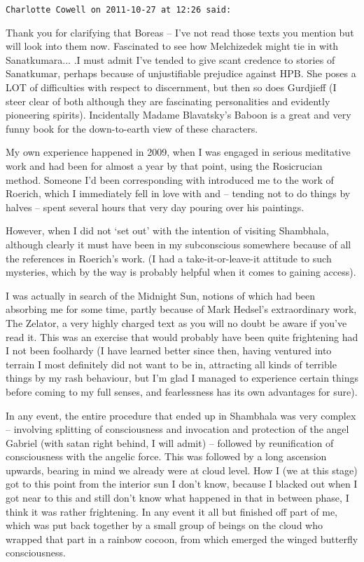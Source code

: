 \begin{footnotesize}
\begin{sffamily}
\hfill

\texttt{Charlotte Cowell on 2011-10-27 at 12:26 said:}

Thank you for clarifying that Boreas -- I've not read those texts you mention but will look into them now. Fascinated to see how Melchizedek might tie in with Sanatkumara... .I must admit I've tended to give scant credence to stories of Sanatkumar, perhaps because of unjustifiable prejudice against HPB. She poses a LOT of difficulties with respect to discernment, but then so does Gurdjieff (I steer clear of both although they are fascinating personalities and evidently pioneering spirits). Incidentally Madame Blavatsky's Baboon is a great and very funny book for the down-to-earth view of these characters.

My own experience happened in 2009, when I was engaged in serious meditative work and had been for almost a year by that point, using the Rosicrucian method. Someone I'd been corresponding with introduced me to the work of Roerich, which I immediately fell in love with and -- tending not to do things by halves -- spent several hours that very day pouring over his paintings.

However, when I did not `set out' with the intention of visiting Shambhala, although clearly it must have been in my subconscious somewhere because of all the references in Roerich's work. (I had a take-it-or-leave-it attitude to such mysteries, which by the way is probably helpful when it comes to gaining access).

I was actually in search of the Midnight Sun, notions of which had been absorbing me for some time, partly because of Mark Hedsel's extraordinary work, The Zelator, a very highly charged text as you will no doubt be aware if you've read it. This was an exercise that would probably have been quite frightening had I not been foolhardy (I have learned better since then, having ventured into terrain I most definitely did not want to be in, attracting all kinds of terrible things by my rash behaviour, but I'm glad I managed to experience certain things before coming to my full senses, and fearlessness has its own advantages for sure).

In any event, the entire procedure that ended up in Shambhala was very complex -- involving splitting of consciousness and invocation and protection of the angel Gabriel (with satan right behind, I will admit) -- followed by reunification of consciousness with the angelic force. This was followed by a long ascension upwards, bearing in mind we already were at cloud level. How I (we at this stage) got to this point from the interior sun I don't know, because I blacked out when I got near to this and still don't know what happened in that in between phase, I think it was rather frightening. In any event it all but finished off part of me, which was put back together by a small group of beings on the cloud who wrapped that part in a rainbow cocoon, from which emerged the winged butterfly consciousness.


\end{sffamily}
\end{footnotesize}
